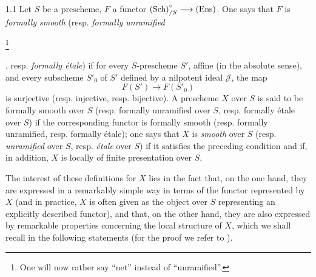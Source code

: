 \begin{definition}{1.1}\label{XI.1.1}
Let $S$ be a prescheme, $F$ a functor $\textup{(Sch)}^\circ_{/S}\longrightarrow\textup{(Ens)}$. One says that $F$ is \emph{formally smooth} (resp. \emph{formally unramified}{\renewcommand{\thefootnote}{*}\footnote{One will now rather say ``net'' instead of ``unramified''.}\addtocounter{footnote}{-1}}, resp. \emph{formally étale}) if for every $S$-prescheme $S'$, affine (in the absolute sense), and every subscheme $S'_0$ of $S'$ defined by a nilpotent ideal $\mathscr J$, the map
\[
F(S')\to F(S'_0)
\]
is surjective (resp. injective, resp. bijective). A prescheme $X$ over $S$ is said to be formally smooth over $S$ (resp. formally unramified over $S$, resp. formally étale over $S$) if the corresponding functor is formally smooth (resp. formally unramified, resp. formally étale); one says that $X$ is \emph{smooth} over $S$ (resp. \emph{unramified} over $S$, resp. \emph{étale} over $S$) if it satisfies the preceding condition and if, in addition, $X$ is locally of finite presentation over $S$.
\end{definition}

The interest of these definitions for $X$ lies in the fact that, on the one hand, they are expressed in a remarkably simple way in terms of the functor represented by $X$ (and in practice, $X$ is often given as the object over $S$ representing an explicitly described functor), and that, on the other hand, they are also expressed by remarkable properties concerning the local structure of $X$, which we shall recall in the following statements (for the proof we refer to \loccit).


